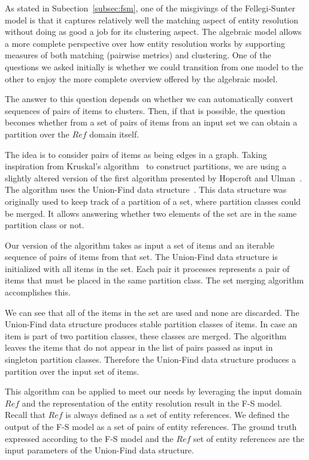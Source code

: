 
As stated in Subection~\ref{subsec:fsm}, one of the misgivings of the Fellegi-Sunter model is that
it captures relatively well the matching aspect of entity resolution without
doing as good a job for its clustering aspect.
The algebraic model allows a more complete perspective over how entity
resolution works by supporting measures of both matching (pairwise metrics)
and clustering.
One of the questions we asked initially is whether we could transition from
one model to the other to enjoy the more complete overview offered by the
algebraic model.

The answer to this question depends on whether we can automatically convert
sequences of pairs of items to clusters.
Then, if that is possible, the question becomes whether from a set of pairs
of items from an input set we can obtain a partition over the $Ref$ domain
itself.

The idea is to consider pairs of items as being edges in a graph.
Taking inspiration from Kruskal's algorithm~\cite{kruskal1956} to construct
partitions, we are using a slightly altered version of the first algorithm
presented by Hopcroft and Ulman~\cite{hopcroft1973set}.
The algorithm uses the Union-Find data structure~\cite{unionfind1964}.
This data structure was originally used to keep track of a partition of a set,
where partition classes could be merged.
It allows answering whether two elements of the set are in the same partition
class or not.

Our version of the algorithm takes as input a set of items and an iterable
sequence of pairs of items from that set.
The Union-Find data structure is initialized with all items in the set.
Each pair it processes represents a pair of items that must be placed in the
same partition class.
The set merging algorithm accomplishes this.

We can see that all of the items in the set are used and none are discarded.
The Union-Find data structure produces stable partition classes of items.
In case an item is part of two partition classes, these classes are merged.
The algorithm leaves the items that do not appear in the list of pairs passed as
input in singleton partition classes.
Therefore the Union-Find data structure produces a partition over the input
set of items.

This algorithm can be applied to meet our needs by leveraging the input domain
$Ref$ and the representation of the entity resolution result in the F-S model.
Recall that $Ref$ is always defined as a set of entity references.
We defined the output of the F-S model as a set of pairs of entity
references.
The ground truth expressed according to the F-S model and the $Ref$ set of
entity references are the input parameters of the Union-Find data structure.


